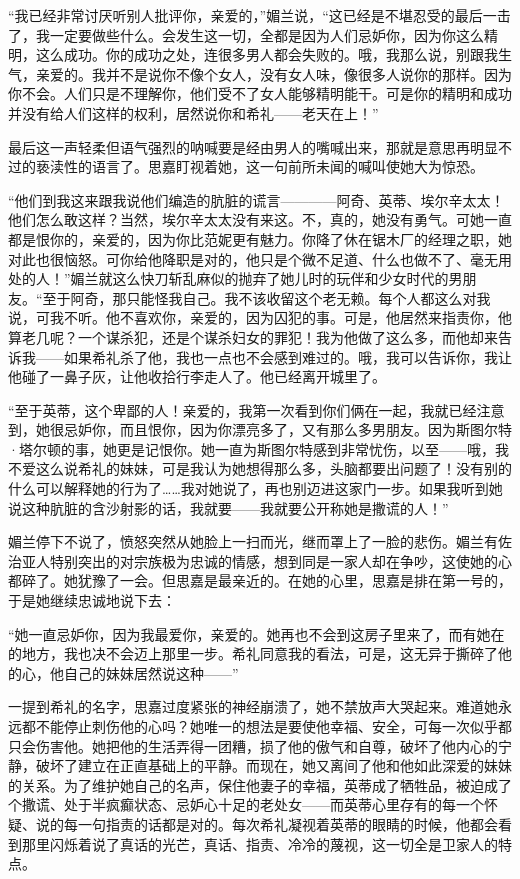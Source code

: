 \par “我已经非常讨厌听别人批评你，亲爱的，”媚兰说，“这已经是不堪忍受的最后一击了，我一定要做些什么。会发生这一切，全都是因为人们忌妒你，因为你这么精明，这么成功。你的成功之处，连很多男人都会失败的。哦，我那么说，别跟我生气，亲爱的。我并不是说你不像个女人，没有女人味，像很多人说你的那样。因为你不会。人们只是不理解你，他们受不了女人能够精明能干。可是你的精明和成功并没有给人们这样的权利，居然说你和希礼——老天在上！”
\par 最后这一声轻柔但语气强烈的呐喊要是经由男人的嘴喊出来，那就是意思再明显不过的亵渎性的语言了。思嘉盯视着她，这一句前所未闻的喊叫使她大为惊恐。
\par “他们到我这来跟我说他们编造的肮脏的谎言————阿奇、英蒂、埃尔辛太太！他们怎么敢这样？当然，埃尔辛太太没有来这。不，真的，她没有勇气。可她一直都是恨你的，亲爱的，因为你比范妮更有魅力。你降了休在锯木厂的经理之职，她对此也很恼怒。可你给他降职是对的，他只是个微不足道、什么也做不了、毫无用处的人！”媚兰就这么快刀斩乱麻似的抛弃了她儿时的玩伴和少女时代的男朋友。“至于阿奇，那只能怪我自己。我不该收留这个老无赖。每个人都这么对我说，可我不听。他不喜欢你，亲爱的，因为囚犯的事。可是，他居然来指责你，他算老几呢？一个谋杀犯，还是个谋杀妇女的罪犯！我为他做了这么多，而他却来告诉我——如果希礼杀了他，我也一点也不会感到难过的。哦，我可以告诉你，我让他碰了一鼻子灰，让他收拾行李走人了。他已经离开城里了。
\par “至于英蒂，这个卑鄙的人！亲爱的，我第一次看到你们俩在一起，我就已经注意到，她很忌妒你，而且恨你，因为你漂亮多了，又有那么多男朋友。因为斯图尔特·塔尔顿的事，她更是记恨你。她一直为斯图尔特感到非常忧伤，以至——哦，我不爱这么说希礼的妹妹，可是我认为她想得那么多，头脑都要出问题了！没有别的什么可以解释她的行为了……我对她说了，再也别迈进这家门一步。如果我听到她说这种肮脏的含沙射影的话，我就要——我就要公开称她是撒谎的人！”
\par 媚兰停下不说了，愤怒突然从她脸上一扫而光，继而罩上了一脸的悲伤。媚兰有佐治亚人特别突出的对宗族极为忠诚的情感，想到同是一家人却在争吵，这使她的心都碎了。她犹豫了一会。但思嘉是最亲近的。在她的心里，思嘉是排在第一号的，于是她继续忠诚地说下去：
\par “她一直忌妒你，因为我最爱你，亲爱的。她再也不会到这房子里来了，而有她在的地方，我也决不会迈上那里一步。希礼同意我的看法，可是，这无异于撕碎了他的心，他自己的妹妹居然说这种——”
\par 一提到希礼的名字，思嘉过度紧张的神经崩溃了，她不禁放声大哭起来。难道她永远都不能停止刺伤他的心吗？她唯一的想法是要使他幸福、安全，可每一次似乎都只会伤害他。她把他的生活弄得一团糟，损了他的傲气和自尊，破坏了他内心的宁静，破坏了建立在正直基础上的平静。而现在，她又离间了他和他如此深爱的妹妹的关系。为了维护她自己的名声，保住他妻子的幸福，英蒂成了牺牲品，被迫成了个撒谎、处于半疯癫状态、忌妒心十足的老处女——而英蒂心里存有的每一个怀疑、说的每一句指责的话都是对的。每次希礼凝视着英蒂的眼睛的时候，他都会看到那里闪烁着说了真话的光芒，真话、指责、冷冷的蔑视，这一切全是卫家人的特点。
